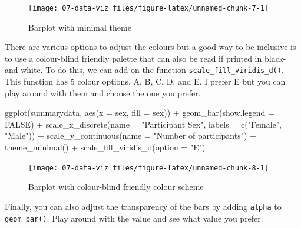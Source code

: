 \documentclass[
  oneside]{book}
\newenvironment{Shaded}{\begin{snugshade}}{\end{snugshade}}
\newcommand{\AttributeTok}[1]{\textcolor[rgb]{0.77,0.63,0.00}{#1}}
\newcommand{\ConstantTok}[1]{\textcolor[rgb]{0.00,0.00,0.00}{#1}}
\newcommand{\FunctionTok}[1]{\textcolor[rgb]{0.00,0.00,0.00}{#1}}
\newcommand{\NormalTok}[1]{#1}
\newcommand{\SpecialCharTok}[1]{\textcolor[rgb]{0.00,0.00,0.00}{#1}}
\newcommand{\StringTok}[1]{\textcolor[rgb]{0.31,0.60,0.02}{#1}}
\begin{document}
\begin{figure}

{\centering \texttt{[image: 07-data-viz\_files/figure-latex/unnamed-chunk-7-1]} 

}

\caption{Barplot with minimal theme}\label{fig:unnamed-chunk-7}
\end{figure}

There are various options to adjust the colours but a good way to be inclusive is to use a colour-blind friendly palette that can also be read if printed in black-and-white. To do this, we can add on the function \texttt{scale\_fill\_viridis\_d()}. This function has 5 colour options, A, B, C, D, and E. I prefer E but you can play around with them and choose the one you prefer.

\begin{Shaded}
\begin{Highlighting}[]
\FunctionTok{ggplot}\NormalTok{(summarydata, }\FunctionTok{aes}\NormalTok{(}\AttributeTok{x =}\NormalTok{ sex, }\AttributeTok{fill =}\NormalTok{ sex)) }\SpecialCharTok{+}
  \FunctionTok{geom\_bar}\NormalTok{(}\AttributeTok{show.legend =} \ConstantTok{FALSE}\NormalTok{) }\SpecialCharTok{+}
  \FunctionTok{scale\_x\_discrete}\NormalTok{(}\AttributeTok{name =} \StringTok{"Participant Sex"}\NormalTok{, }
                   \AttributeTok{labels =} \FunctionTok{c}\NormalTok{(}\StringTok{"Female"}\NormalTok{, }\StringTok{"Male"}\NormalTok{)) }\SpecialCharTok{+}
  \FunctionTok{scale\_y\_continuous}\NormalTok{(}\AttributeTok{name =} \StringTok{"Number of participants"}\NormalTok{) }\SpecialCharTok{+}
  \FunctionTok{theme\_minimal}\NormalTok{() }\SpecialCharTok{+}
  \FunctionTok{scale\_fill\_viridis\_d}\NormalTok{(}\AttributeTok{option =} \StringTok{"E"}\NormalTok{)}
\end{Highlighting}
\end{Shaded}

\begin{figure}

{\centering \texttt{[image: 07-data-viz\_files/figure-latex/unnamed-chunk-8-1]} 

}

\caption{Barplot with colour-blind friendly colour scheme}\label{fig:unnamed-chunk-8}
\end{figure}

Finally, you can also adjust the transparency of the bars by adding \texttt{alpha} to \texttt{geom\_bar()}. Play around with the value and see what value you prefer.
\end{document}
